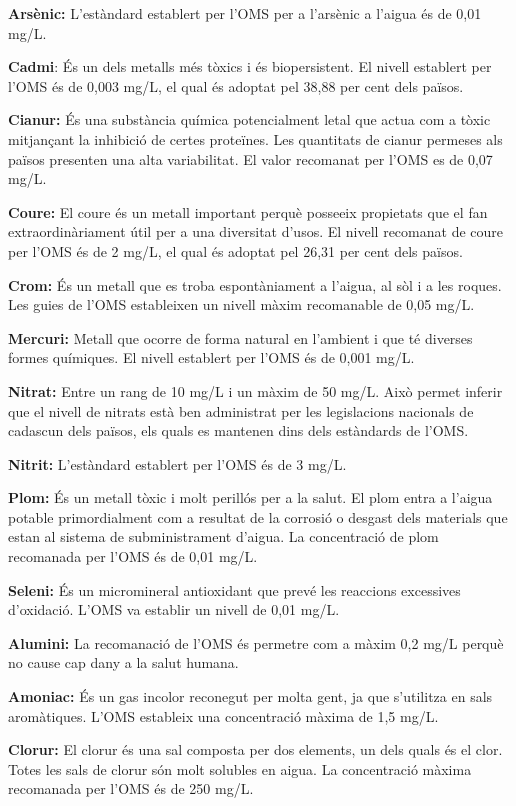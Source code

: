 \textbf{Arsènic:} L’estàndard establert per l’OMS per a l’arsènic a l’aigua és de 0,01 mg/L.

\textbf{Cadmi}: És un dels metalls més tòxics i és biopersistent. El nivell establert per l’OMS és de 0,003 mg/L, el qual és adoptat pel 38,88 per cent dels països.

\textbf{Cianur:} És una substància química potencialment letal que actua com a tòxic mitjançant la inhibició de certes proteïnes. Les quantitats de cianur permeses als països presenten una alta variabilitat. El valor recomanat per l'OMS es de 0,07 mg/L.

\textbf{Coure:}  El coure és un metall important perquè posseeix propietats que el fan extraordinàriament útil per a una diversitat d’usos. El nivell recomanat de coure per l’OMS és de 2 mg/L, el qual és adoptat pel 26,31 per cent dels països.

\textbf{Crom:} És un metall que es troba espontàniament a l’aigua, al sòl i a les roques. Les guies de l’OMS estableixen un nivell màxim recomanable de 0,05 mg/L.

\textbf{Mercuri:} Metall que ocorre de forma natural en l’ambient i que té diverses formes químiques. El nivell establert per l’OMS és de 0,001 mg/L.

\textbf{Nitrat:} Entre un rang de 10 mg/L i un màxim de 50 mg/L. Això permet inferir que el nivell de nitrats està ben administrat per les legislacions nacionals de cadascun dels països, els quals es mantenen dins dels estàndards de l’OMS.

\textbf{Nitrit:} L’estàndard establert per l’OMS és de 3 mg/L.

\textbf{Plom:} És un metall tòxic i molt perillós per a la salut. El plom entra a l’aigua potable primordialment com a resultat de la corrosió o desgast dels materials que estan al sistema de subministrament d’aigua. La concentració de plom recomanada per l’OMS és de 0,01 mg/L.

\textbf{Seleni:} És un micromineral antioxidant que prevé les reaccions excessives d’oxidació. L’OMS va establir un nivell de 0,01 mg/L.

\textbf{Alumini:} La recomanació de l’OMS és permetre com a màxim 0,2 mg/L perquè no cause cap dany a la salut humana.

\textbf{Amoniac:} És un gas incolor reconegut per molta gent, ja que s’utilitza en sals aromàtiques. L’OMS estableix una concentració màxima de 1,5 mg/L.

\textbf{Clorur:} El clorur és una sal composta per dos elements, un dels quals és el clor. Totes les sals de clorur són molt solubles en aigua. La concentració màxima recomanada per l’OMS és de 250 mg/L.

